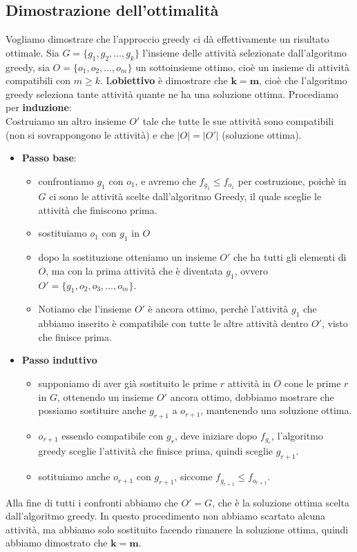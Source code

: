 \subsection{Dimostrazione dell'ottimalità}
Vogliamo dimostrare che l'approccio greedy ci dà effettivamente un risultato ottimale. Sia $G = \{  g_1,g_2, \dots , g_k  \}$ l'insieme 
delle attività selezionate dall'algoritmo greedy, sia $O=\{  o_1,o_2,\dots, o_m   \}$ un sottoinsieme ottimo, cioè un insieme di attività compatibili
con $m\ge k$. L\textbf{obiettivo} è dimostrare che $\bm{k = m}$, cioè che l'algoritmo greedy seleziona tante attività quante ne ha 
una soluzione ottima. Procediamo per \textbf{induzione}:\smallskip\\
Costruiamo un altro insieme $O'$ tale che tutte le sue attività sono compatibili
(non si sovrappongono le attività) e che $|O| = |O'|$ (soluzione ottima).
\begin{itemize}
    \item \textbf{Passo base}:
    \begin{itemize}
        \item confrontiamo $g_1$ con $o_1$, e avremo che $f_{g_1} \le f_{o_1}$ per costruzione, poichè in $G$ ci sono
        le attività scelte dall'algoritmo Greedy, il quale sceglie le attività che finiscono prima.
        \item sostituiamo $o_1$ con $g_1$ in $O$
        \item dopo la sostituzione otteniamo un insieme $O'$ che ha tutti gli elementi di $O$, ma con
        la prima attività che è diventata $g_1$, ovvero $O' = \{ g_1, o_2, o_3, \dots, o_m  \}$.
        \item Notiamo che l'insieme $O'$ è ancora ottimo, perchè l'attività $g_1$ che abbiamo inserito è compatibile
        con tutte le altre attività dentro $O'$, visto che finisce prima.
    \end{itemize}

    \item \textbf{Passo induttivo}
    \begin{itemize}
        \item supponiamo di aver già sostituito le prime $r$ attività in $O$ cone le prime $r$ in $G$,
        ottenendo un insieme $O'$ ancora ottimo, dobbiamo mostrare che possiamo sostituire anche $g_{r+1}$ a $o_{r+1}$, 
        mantenendo una soluzione ottima.
        \item $o_{r+1}$ essendo compatibile con $g_r$, deve iniziare dopo $f_{g_r}$, l'algoritmo greedy sceglie
        l'attività che finisce prima, quindi sceglie $g_{r+1}$. 
        \item sotituiamo anche $o_{r+1}$ con $g_{r+1}$, siccome $f_{g_{r+1}} \le f_{o_{r+1}}$.
    \end{itemize}
\end{itemize}
Alla fine di tutti i confronti abbiamo che $O' = G$, che è la soluzione ottima scelta dall'algoritmo greedy. 
In questo procedimento non abbiamo scartato alcuna attività, ma abbiamo solo sostituito facendo rimanere la soluzione ottima,
quindi abbiamo dimostrato che $\bm{k = m}$.



